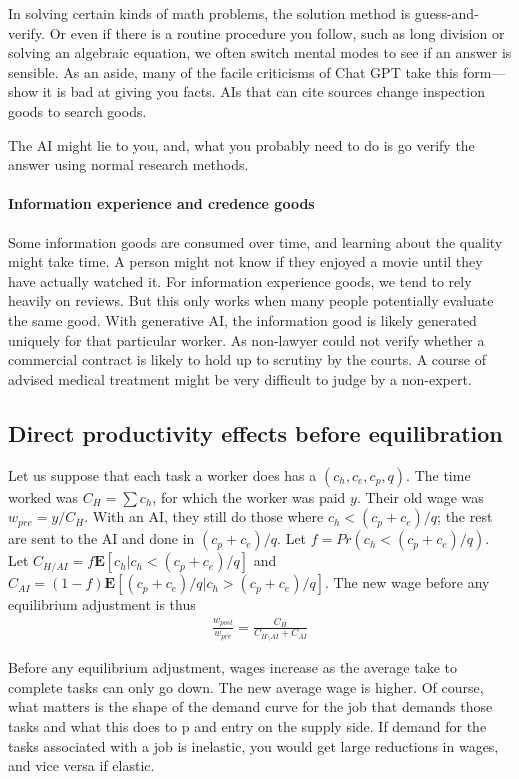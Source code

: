 \documentclass{article}
\begin{document}
In solving certain kinds of math problems, the solution method is guess-and-verify. 
Or even if there is a routine procedure you follow, such as long division or solving an algebraic equation, we often switch mental modes to see if an answer is sensible. 
As an aside, many of the facile criticisms of Chat GPT take this form---show it is bad at giving you facts.  
AIs that can cite sources change inspection goods to search goods. 

The AI might lie to you, and, what you probably need to do is go verify the answer using normal research methods.

\paragraph{Information experience and credence goods}
Some information goods are consumed over time, and learning about the quality might take time. 
A person might not know if they enjoyed a movie until they have actually watched it. 
For information experience goods, we tend to rely heavily on reviews. 
But this only works when many people potentially evaluate the same good. 
With generative AI, the information good is likely generated uniquely for that particular worker. 
As non-lawyer could not verify whether a commercial contract is likely to hold up to scrutiny by the courts. 
A course of advised medical treatment might be very difficult to judge by a non-expert.


\subsection{Direct productivity effects before equilibration}
Let us suppose that each task a worker does has a $(c_h, c_e, c_p, q)$.
The time worked was $C_H = \sum c_h$, for which the worker was paid $y$.
Their old wage was $w_{pre} = y / C_H$.
With an AI, they still do those where $c_h < (c_p + c_e)/q$; the rest are sent to the AI and done in $(c_p + c_e)/q$.
Let $f = Pr(c_h < (c_p + c_e)/q)$.
Let $C_{H/AI} = f \mathbf{E}[c_h | c_h < (c_p + c_e)/q]$ 
and 
$C_{AI} = (1 - f)\mathbf{E}[(c_p + c_e)/q | c_h > (c_p + c_e)/q]$.
The new wage before any equilibrium adjustment is thus 
\begin{align}
  \frac{w_{post}}{w_{pre}} = \frac{C_H}{  C_{H \setminus AI} + C_{AI} }
\end{align}

Before any equilibrium adjustment, wages increase as the average take to complete tasks can only go down.
The new average wage is higher.
Of course, what matters is the shape of the demand curve for the job that demands those tasks and what this does to p and entry on the supply side.
If demand for the tasks associated with a job is inelastic, you would get large reductions in wages, and vice versa if elastic.
\end{document}
